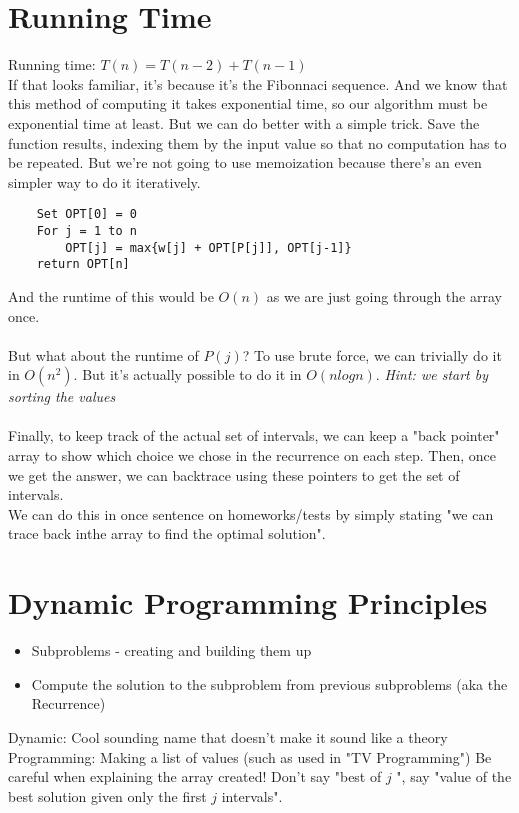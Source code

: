 \documentclass[oneside]{book}
\begin{document}
\section{Running Time}
Running time: $T(n) = T(n-2) + T(n-1)$ \\
If that looks familiar, it's because it's the Fibonnaci sequence. And we know that this method of computing it takes exponential time, so our algorithm must be exponential time at least. But we can do better with a simple trick.
 {
    Save the function results, indexing them by the input value so that     no computation has to be repeated.
}
But we're not going to use memoization because there's an even simpler way to do it iteratively.

\begin{verbatim}
    Set OPT[0] = 0
    For j = 1 to n
        OPT[j] = max{w[j] + OPT[P[j]], OPT[j-1]}
    return OPT[n]
\end{verbatim}
And the runtime of this would be $O(n)$ as we are just going through the array once.
\\\\
But what about the runtime of $P(j)$? To use brute force, we can trivially do it in $O(n^2)$. But it's actually possible to do it in $O(nlogn)$. \textit{Hint: we start by sorting the values}
\\\\
Finally, to keep track of the actual set of intervals, we can keep a "back pointer" array to show which choice we chose in the recurrence on each step. Then, once we get the answer, we can backtrace using these pointers to get the set of intervals. \\ We can do this in once sentence on homeworks/tests by simply stating "we can trace back inthe array to find the optimal solution".

\section{Dynamic Programming Principles}
\begin{itemize}
    \item Subproblems - creating and building them up
    \item Compute the solution to the subproblem from previous subproblems (aka the Recurrence)
\end{itemize}

 {
   Dynamic: Cool sounding name that doesn't make it sound like a theory
   \\
   Programming: Making a list of values (such as used in "TV Programming")
}
Be careful when explaining the array created! Don't say "best of $j$ ", say "value of the best solution given only the first $j$ intervals".
\end{document}
